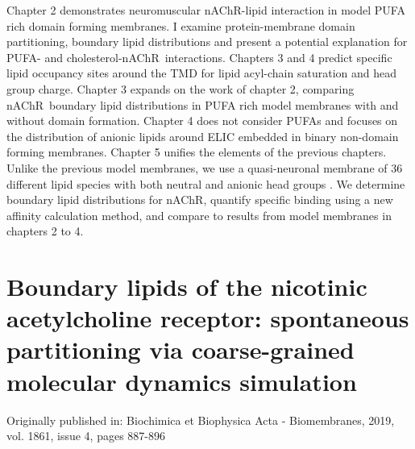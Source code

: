 \documentclass[12pt]{ruthesis_nofloat}
\newcommand{\nachr}{nAChR}
\newcommand{\plgic}{pLGIC}
\begin{document}
Chapter 2 demonstrates neuromuscular \nachr-lipid \citep{Unwin2005} interaction in model PUFA rich domain forming membranes. I examine  protein-membrane domain partitioning, boundary lipid distributions and present a potential explanation for PUFA- and cholesterol-\nachr~interactions. Chapters 3 and 4 predict specific lipid occupancy sites around the TMD for lipid acyl-chain saturation and head group charge. Chapter 3 expands on the work of chapter 2, comparing \nachr~boundary lipid distributions in PUFA rich model membranes with and without domain formation. Chapter 4 does not consider PUFAs and focuses on the distribution of anionic lipids around ELIC \citep{Pan2012} embedded in binary non-domain forming membranes. Chapter 5 unifies the elements of the previous chapters. Unlike the previous model membranes, we use a quasi-neuronal membrane of 36 different lipid species with both neutral and anionic head groups \citep{Ingolfsson2017b}. We determine boundary lipid distributions for \nachr, quantify specific binding using a new affinity calculation method, and compare to  results from model membranes in chapters 2 to 4.


\chapter{Boundary lipids of the nicotinic acetylcholine receptor: spontaneous partitioning via coarse-grained molecular dynamics simulation}
Originally published in: Biochimica et Biophysica Acta - Biomembranes, 2019, vol. 1861, issue 4, pages 887-896\\ \\

\end{document}
